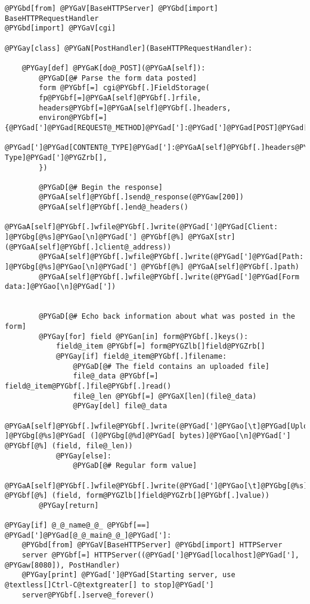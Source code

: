 \documentclass[a4paper,10pt,english]{manual}
\begin{document}
\begin{Verbatim}[commandchars=@\[\]]
@PYGbd[from] @PYGaV[BaseHTTPServer] @PYGbd[import] BaseHTTPRequestHandler
@PYGbd[import] @PYGaV[cgi]

@PYGay[class] @PYGaN[PostHandler](BaseHTTPRequestHandler):

    @PYGay[def] @PYGaK[do@_POST](@PYGaA[self]):
        @PYGaD[@# Parse the form data posted]
        form @PYGbf[=] cgi@PYGbf[.]FieldStorage(
        fp@PYGbf[=]@PYGaA[self]@PYGbf[.]rfile,
        headers@PYGbf[=]@PYGaA[self]@PYGbf[.]headers,
        environ@PYGbf[=]{@PYGad[']@PYGad[REQUEST@_METHOD]@PYGad[']:@PYGad[']@PYGad[POST]@PYGad['],
          @PYGad[']@PYGad[CONTENT@_TYPE]@PYGad[']:@PYGaA[self]@PYGbf[.]headers@PYGZlb[]@PYGad[']@PYGad[Content-Type]@PYGad[']@PYGZrb[],
        })

        @PYGaD[@# Begin the response]
        @PYGaA[self]@PYGbf[.]send@_response(@PYGaw[200])
        @PYGaA[self]@PYGbf[.]end@_headers()
        @PYGaA[self]@PYGbf[.]wfile@PYGbf[.]write(@PYGad[']@PYGad[Client: ]@PYGbg[@%s]@PYGao[\n]@PYGad['] @PYGbf[@%] @PYGaX[str](@PYGaA[self]@PYGbf[.]client@_address))
        @PYGaA[self]@PYGbf[.]wfile@PYGbf[.]write(@PYGad[']@PYGad[Path: ]@PYGbg[@%s]@PYGao[\n]@PYGad['] @PYGbf[@%] @PYGaA[self]@PYGbf[.]path)
        @PYGaA[self]@PYGbf[.]wfile@PYGbf[.]write(@PYGad[']@PYGad[Form data:]@PYGao[\n]@PYGad['])


        @PYGaD[@# Echo back information about what was posted in the form]
        @PYGay[for] field @PYGan[in] form@PYGbf[.]keys():
            field@_item @PYGbf[=] form@PYGZlb[]field@PYGZrb[]
            @PYGay[if] field@_item@PYGbf[.]filename:
                @PYGaD[@# The field contains an uploaded file]
                file@_data @PYGbf[=] field@_item@PYGbf[.]file@PYGbf[.]read()
                file@_len @PYGbf[=] @PYGaX[len](file@_data)
                @PYGay[del] file@_data
                @PYGaA[self]@PYGbf[.]wfile@PYGbf[.]write(@PYGad[']@PYGao[\t]@PYGad[Uploaded ]@PYGbg[@%s]@PYGad[ (]@PYGbg[@%d]@PYGad[ bytes)]@PYGao[\n]@PYGad['] @PYGbf[@%] (field, file@_len))
            @PYGay[else]:
                @PYGaD[@# Regular form value]
                @PYGaA[self]@PYGbf[.]wfile@PYGbf[.]write(@PYGad[']@PYGao[\t]@PYGbg[@%s]@PYGad[=]@PYGbg[@%s]@PYGao[\n]@PYGad['] @PYGbf[@%] (field, form@PYGZlb[]field@PYGZrb[]@PYGbf[.]value))
        @PYGay[return]

@PYGay[if] @_@_name@_@_ @PYGbf[==] @PYGad[']@PYGad[@_@_main@_@_]@PYGad[']:
    @PYGbd[from] @PYGaV[BaseHTTPServer] @PYGbd[import] HTTPServer
    server @PYGbf[=] HTTPServer((@PYGad[']@PYGad[localhost]@PYGad['], @PYGaw[8080]), PostHandler)
    @PYGay[print] @PYGad[']@PYGad[Starting server, use @textless[]Ctrl-C@textgreater[] to stop]@PYGad[']
    server@PYGbf[.]serve@_forever()
\end{Verbatim}
\end{document}
